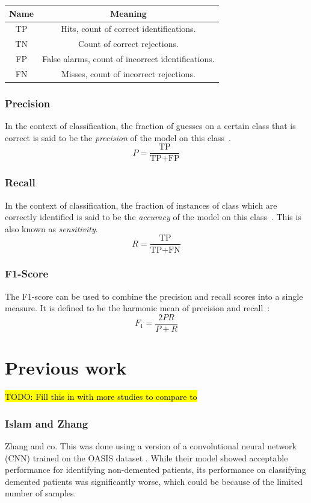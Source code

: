\documentclass{kththesis}
\begin{document}
\begin{table}[H]
  \begin{center}
    \begin{tabular}{cc}
      \textbf{Name} & \textbf{Meaning} \\
      \toprule
      TP & Hits, count of correct identifications. \\
      TN & Count of correct rejections. \\
      FP & False alarms, count of incorrect identifications. \\
      FN & Misses, count of incorrect rejections.
    \end{tabular}
  \end{center}
\end{table}

\subsubsection{Precision}
In the context of classification, the fraction of guesses on a certain class that is correct is said to be the \textit{precision} of the model on this class~\cite[p.~5]{irbook}.
\[ P = \frac{\text{TP}}{\text{TP} + \text{FP}} \]

\subsubsection{Recall}
In the context of classification, the fraction of instances of class which are correctly identified is said to be the \textit{accuracy} of the model on this class~\cite[p.~5]{irbook}. This is also known as \textit{sensitivity}.
\[ R = \frac{\text{TP}}{\text{TP} + \text{FN}} \]

\subsubsection{F1-Score}
The F1-score can be used to combine the precision and recall scores into a single measure. It is defined to be the harmonic mean of precision and recall~\cite[p.~156-167]{irbook}:
\[ F_1 = \frac{2PR}{P + R} \]

\section{Previous work}
\hl{TODO: Fill this in with more studies to compare to}
\subsubsection{Islam and Zhang}
Zhang and co.
This was done using a version of a convolutional neural network (CNN) trained on the OASIS dataset \parencite{oasis}. While their model showed acceptable performance for identifying non-demented patients, its performance on classifying demented patients was significantly worse, which could be because of the limited number of samples.
\end{document}

